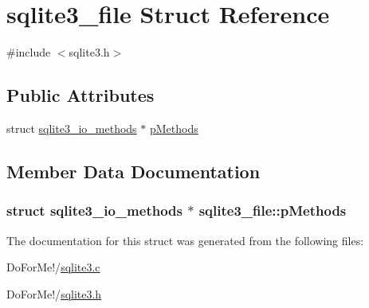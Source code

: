 \hypertarget{structsqlite3__file}{\section{sqlite3\-\_\-file Struct Reference}
\label{structsqlite3__file}
}


{\ttfamily \#include $<$sqlite3.\-h$>$}

\subsection*{Public Attributes}
\begin{DoxyCompactItemize}
\item 
struct \hyperlink{structsqlite3__io__methods}{sqlite3\-\_\-io\-\_\-methods} $\ast$ \hyperlink{structsqlite3__file_afb7c7beec15f0867d22f5260fcee24d3}{p\-Methods}
\end{DoxyCompactItemize}


\subsection{Member Data Documentation}
\hypertarget{structsqlite3__file_afb7c7beec15f0867d22f5260fcee24d3}{
\subsubsection[{p\-Methods}]{\setlength{\rightskip}{0pt plus 5cm}struct {\bf sqlite3\-\_\-io\-\_\-methods} $\ast$ sqlite3\-\_\-file\-::p\-Methods}}\label{structsqlite3__file_afb7c7beec15f0867d22f5260fcee24d3}


The documentation for this struct was generated from the following files\-:\begin{DoxyCompactItemize}
\item 
Do\-For\-Me!/\hyperlink{sqlite3_8c}{sqlite3.\-c}\item 
Do\-For\-Me!/\hyperlink{sqlite3_8h}{sqlite3.\-h}\end{DoxyCompactItemize}
